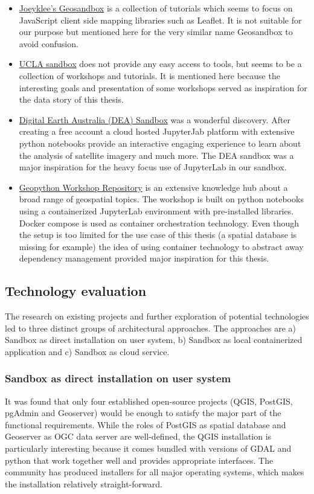 \documentclass[11pt, a4paper, oneside, parskip=full-]{scrartcl}
\begin{document}
\begin{itemize}
  \item \href{https://joeyklee.github.io/geosandbox/}{Joeyklee's Geosandbox} is
  a collection of tutorials which seems to focus on JavaScript client side
  mapping libraries such as Leaflet. It is not suitable for our purpose but
  mentioned here for the very similar name Geosandbox to avoid confusion.
  \item \href{https://sandbox.idre.ucla.edu/sandbox/category/projects}{UCLA
  sandbox} does not provide any easy access to tools, but seems to be a
  collection of workshops and tutorials. It is mentioned here because the
  interesting goals and presentation of some workshops served as inspiration for
  the data story of this thesis.
  \item \href{https://www.dea.ga.gov.au/developers/sandbox}{Digital Earth
  Australia (DEA) Sandbox} was a wonderful discovery. After creating a free
  account a cloud hosted JupyterJab platform with extensive python notebooks
  provide an interactive engaging experience to learn about the analysis of
  satellite imagery and much more. The DEA sandbox was a major inspiration for
  the heavy focus use of JupyterLab in our sandbox.
  \item \href{https://github.com/geopython/geopython-workshop}{Geopython
  Workshop Repository} is an extensive knowledge hub about a broad range of
  geospatial topics. The workshop is built on python notebooks using a
  containerized JupyterLab environment with pre-installed libraries. Docker
  compose is used as container orchestration technology. Even though the setup
  is too limited for the use case of this thesis (a spatial database is missing
  for example) the idea of using container technology to abstract away
  dependency management provided major inspiration for this thesis.
\end{itemize}

\subsection{Technology evaluation}
The research on existing projects and further exploration of potential
technologies led to three distinct groups of architectural approaches. The
approaches are a) Sandbox as direct installation on user system, b) Sandbox as
local containerized application and c) Sandbox as cloud service.

\subsubsection*{Sandbox as direct installation on user system}
It was found that only four established open-source projects (QGIS, PostGIS,
pgAdmin and Geoserver) would be enough to satisfy the major part of the
functional requirements. While the roles of PostGIS as spatial database and
Geoserver as OGC data server are well-defined, the QGIS installation is
particularly interesting because it comes bundled with versions of GDAL and
python that work together well and provides appropriate interfaces. The
community has produced installers for all major operating systems, which makes
the installation relatively straight-forward.
\end{document}
